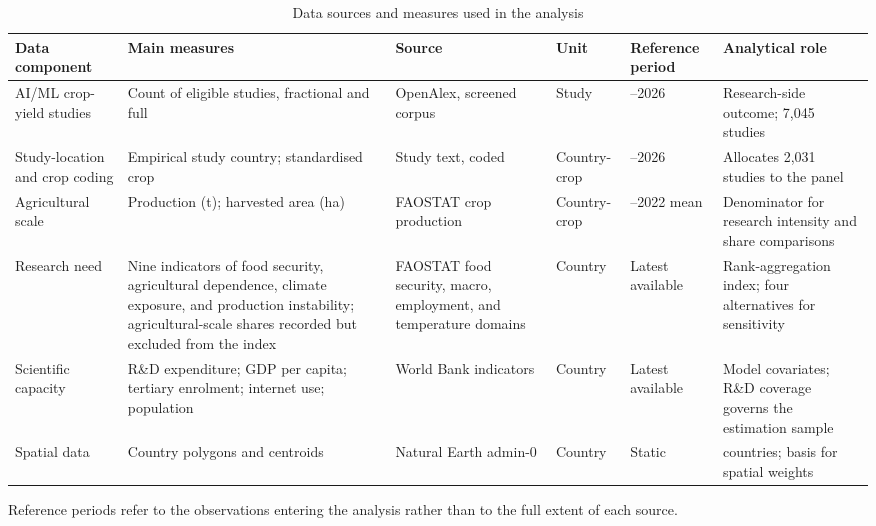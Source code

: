 \documentclass[ASNA,twocolumn]{USG}
\begin{document}
\begin{table}[!t]
\centering
\footnotesize
\setlength{\tabcolsep}{4pt}
\renewcommand{\arraystretch}{1.15}
\caption{Data sources and measures used in the analysis}
\label{tab:data}
\begin{tabular}{@{}>{\raggedright\arraybackslash}p{2.15cm}
                  >{\raggedright\arraybackslash}p{3.05cm}
                  >{\raggedright\arraybackslash}p{2.45cm}
                  >{\raggedright\arraybackslash}p{1.95cm}
                  >{\raggedright\arraybackslash}p{1.75cm}
                  >{\raggedright\arraybackslash}p{2.75cm}@{}}
\toprule
Data component & Main measures & Source & Unit & Reference period & Analytical role \\
\midrule
AI/ML crop-yield studies &
Count of eligible studies, fractional and full &
OpenAlex, screened corpus &
Study &
2000--2026 &
Research-side outcome; 7,045 studies \\
\addlinespace
Study-location and crop coding &
Empirical study country; standardised crop &
Study text, coded &
Country-crop &
2000--2026 &
Allocates 2,031 studies to the panel \\
\addlinespace
Agricultural scale &
Production (t); harvested area (ha) &
FAOSTAT crop production &
Country-crop &
2018--2022 mean &
Denominator for research intensity and share comparisons \\
\addlinespace
Research need &
Nine indicators of food security, agricultural dependence, climate exposure, and production
instability; agricultural-scale shares recorded but excluded from the index &
FAOSTAT food security, macro, employment, and temperature domains &
Country &
Latest available &
Rank-aggregation index; four alternatives for sensitivity \\
\addlinespace
Scientific capacity &
R\&D expenditure; GDP per capita; tertiary enrolment; internet use; population &
World Bank indicators &
Country &
Latest available &
Model covariates; R\&D coverage governs the estimation sample \\
\addlinespace
Spatial data &
Country polygons and centroids &
Natural Earth admin-0 &
Country &
Static &
195 countries; basis for spatial weights \\
\bottomrule
\end{tabular}
\begin{tablenotes}
\item[] Reference periods refer to the observations entering the analysis rather than to the full extent of each source.
\end{tablenotes}
\end{table}
\end{document}
